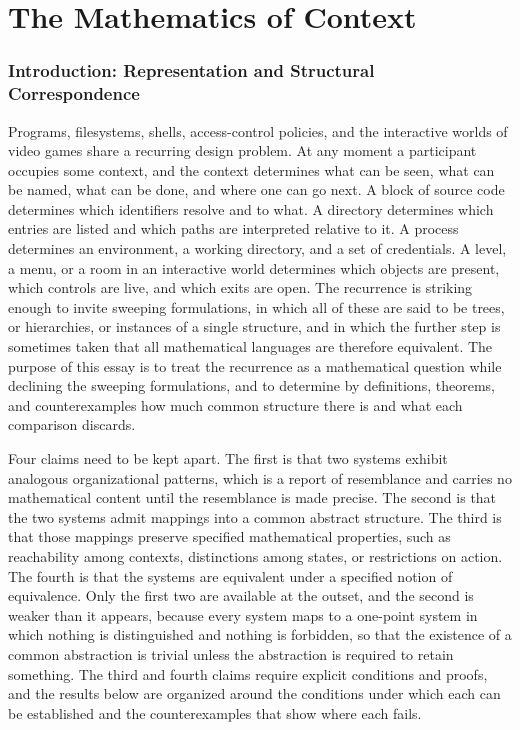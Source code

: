 \part{The Mathematics of Context}

\section{Introduction: Representation and Structural Correspondence}

Programs, filesystems, shells, access-control policies, and the interactive worlds of video games share a recurring design problem. At any moment a participant occupies some context, and the context determines what can be seen, what can be named, what can be done, and where one can go next. A block of source code determines which identifiers resolve and to what. A directory determines which entries are listed and which paths are interpreted relative to it. A process determines an environment, a working directory, and a set of credentials. A level, a menu, or a room in an interactive world determines which objects are present, which controls are live, and which exits are open. The recurrence is striking enough to invite sweeping formulations, in which all of these are said to be trees, or hierarchies, or instances of a single structure, and in which the further step is sometimes taken that all mathematical languages are therefore equivalent. The purpose of this essay is to treat the recurrence as a mathematical question while declining the sweeping formulations, and to determine by definitions, theorems, and counterexamples how much common structure there is and what each comparison discards.

Four claims need to be kept apart. The first is that two systems exhibit analogous organizational patterns, which is a report of resemblance and carries no mathematical content until the resemblance is made precise. The second is that the two systems admit mappings into a common abstract structure. The third is that those mappings preserve specified mathematical properties, such as reachability among contexts, distinctions among states, or restrictions on action. The fourth is that the systems are equivalent under a specified notion of equivalence. Only the first two are available at the outset, and the second is weaker than it appears, because every system maps to a one-point system in which nothing is distinguished and nothing is forbidden, so that the existence of a common abstraction is trivial unless the abstraction is required to retain something. The third and fourth claims require explicit conditions and proofs, and the results below are organized around the conditions under which each can be established and the counterexamples that show where each fails.


